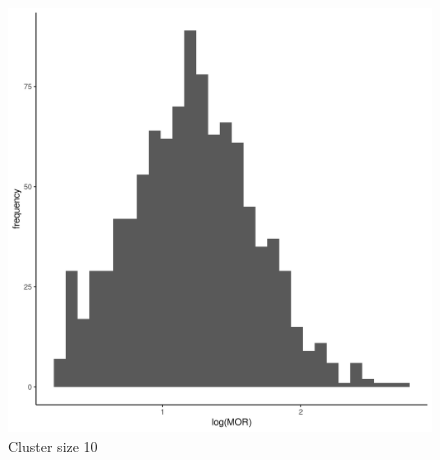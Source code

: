 \documentclass[
  letterpaper,
  DIV=11,
  numbers=noendperiod,
  titlepage]{scrartcl}
\begin{document}
\begin{figure}
\begin{minipage}[t]{0.24\linewidth}
{{\includegraphics{../../plots/two-lvl-ran-slope/low-prev/hist_100_10_two_lvl_slp_low_prev_q1.png}

}

\caption{Cluster size 10}

}

\end{minipage}%
%
\begin{minipage}[t]{0.24\linewidth}

{\centering 

}
\end{minipage}
\end{figure}
\end{document}
